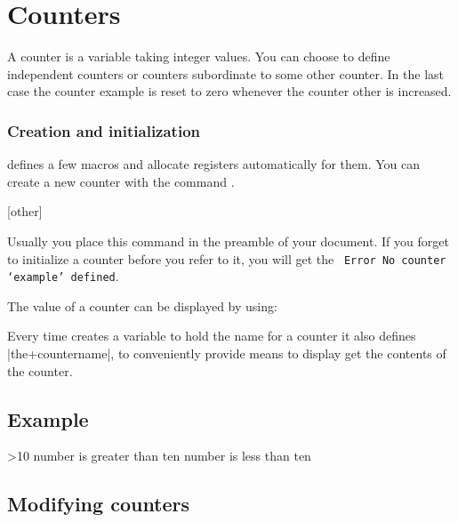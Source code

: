 \chapter{Counters}

A counter is a \tex variable taking integer values. You can choose
to define independent counters or counters subordinate to some
other counter. In the last case the counter example is reset to zero
whenever the counter other is increased. 

\subsection{Creation and initialization}

\latex defines a few macros and allocate registers automatically for them. You can create a new counter with the command .

\begin{teX}
[other]
\end{teX}

Usually you place this command in the preamble of your
document. If you forget to initialize a counter before you refer to
it, you will get the \latex\  \texttt{Error No counter ‘example’ defined}.

The value of a counter can be displayed by using:

\begin{teX}
  \theexample
\end{teX}

Every time \latex creates a variable to hold the name for a counter it also defines |the+countername|, to conveniently provide means to display get the contents of the counter.


\section*{Example}

\begin{teX}
\setcounter{acount}{0}
\addtocounter{acount}{14}

\theacount

\ifnum\theacount>10 number is greater
        than ten \else number is less than ten\fi
\end{teX}



\section{Modifying counters}

